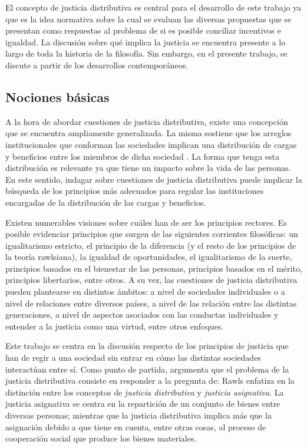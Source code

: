 
El concepto de justicia distributiva es central para el desarrollo de este trabajo ya que es la idea normativa sobre la cual se evaluan las diversas propuestas que se presentan como respuestas al problema de si es posible conciliar incentivos e igualdad. La discusión sobre qué implica la justicia se encuentra presente a lo largo de toda la historia de la filosofía. Sin embargo, en el presente trabajo, se discute a partir de los desarrollos contemporáneos.


\subsection{Nociones básicas} \label{sec2.1}

A la hora de abordar cuestiones de justicia distributiva, existe una concepción que se encuentra ampliamente generalizada. La misma sostiene que los arreglos institucionales que conforman las sociedades implican una distribución de cargas y beneficios entre los miembros de dicha sociedad \citep{Rawls_1971}. La forma que tenga esta distribución es relevante ya que tiene un impacto sobre la vida de las personas. En este sentido, indagar sobre cuestiones de justicia distributiva puede implicar la búsqueda de los principios más adecuados para regular las instituciones encargadas de la distribución de las cargas y beneficios. 

Existen numerables visiones sobre cuáles han de ser los principios rectores. Es posible evidenciar principios que surgen de las siguientes corrientes filosóficas: un igualitarismo estricto, el principio de la diferencia (y el resto de los principios de la teoría rawlsiana), la igualdad de oportunidades, el igualitarismo de la suerte, principios basados en el bienestar de las personas, principios basados en el mérito, principios libertarios, entre otros. A su vez, las cuestiones de justicia distributiva pueden plantearse en distintos ámbitos: a nivel de sociedades individuales o a nivel de relaciones entre diversos países, a nivel de las relación entre las distintas generaciones, a nivel de aspectos asociados con las conductas individuales y entender a la justicia como una virtud, entre otros enfoques.

Este trabajo se centra en la discusión respecto de los principios de justicia que han de regir a una sociedad sin entrar en cómo las distintas sociedades interactúan entre sí. Como punto de partida, \citet[p. 81]{Rawls_2002} argumenta que el problema de la justicia distributiva consiste en responder a la pregunta de:  Rawls enfatiza en la distinción entre los conceptos de \textit{justicia distributiva} y \textit{justicia asignativa}. La justicia asignativa se centra en la repartición de un conjunto de bienes entre diversas personas; mientras que la justicia distributiva implica más que la asignación debido a que tiene en cuenta, entre otras cosas, al proceso de cooperación social que produce los bienes materiales. 

